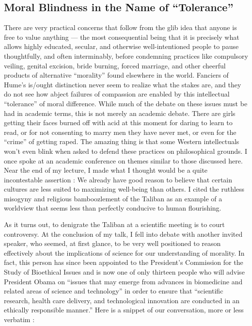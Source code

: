 \documentclass[a4paper,14pt]{extarticle}
\begin{document}
\subsection{Moral Blindness in the Name of ``Tolerance''}

There are very practical concerns that follow from the glib idea that anyone is free to value anything --- the most consequential being that it is precisely what allows highly educated, secular, and otherwise well-intentioned people to pause thoughtfully, and often interminably, before condemning practices like compulsory veiling, genital excision, bride burning, forced marriage, and other cheerful products of alternative ``morality'' found elsewhere in the world.
Fanciers of Hume's is/ought distinction never seem to realize what the stakes are, and they do not see how abject failures of compassion are enabled by this intellectual ``tolerance'' of moral difference.
While much of the debate on these issues must be had in academic terms, this is not merely an academic debate.
There are girls getting their faces burned off with acid at this moment for daring to learn to read, or for not consenting to marry men they have never met, or even for the ``crime'' of getting raped.
The amazing thing is that some Western intellectuals won't even blink when asked to defend these practices on philosophical grounds.
I once spoke at an academic conference on themes similar to those discussed here.
Near the end of my lecture, I made what I thought would be a quite incontestable assertion :
We already have good reason to believe that certain cultures are less suited to maximizing well-being than others.
I cited the ruthless misogyny and religious bamboozlement of the Taliban as an example of a worldview that seems less than perfectly conducive to human flourishing.

As it turns out, to denigrate the Taliban at a scientific meeting is to court controversy.
At the conclusion of my talk, I fell into debate with another invited speaker, who seemed, at first glance, to be very well positioned to reason effectively about the implications of science for our understanding of morality.
In fact, this person has since been appointed to the President's Commission for the Study of Bioethical Issues and is now one of only thirteen people who will advise President Obama on ``issues that may emerge from advances in biomedicine and related areas of science and technology'' in order to ensure that ``scientific research, health care delivery, and technological innovation are conducted in an ethically responsible manner.''
Here is a snippet of our conversation, more or less verbatim :
\end{document}
